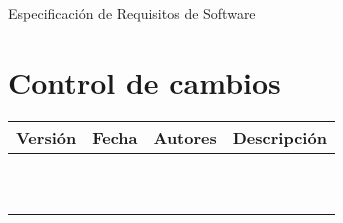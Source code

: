 \documentclass{article}
\title{\nombredelproyecto}
\author{Alejandro Barrachina Argudo \\
David Cantador Piedras \\
Rodrigo Sosa Sáez \\
Juan Pantaleón Femenía Quevedo \\
David Llanes Martín \\
Sergio Sánchez Chamizo  \\
Samuel Rodríguez Moreno \\
Rodrigo Souto Santos
}
\date{\today}
\begin{document}
\begin{titlepage}
    \makeatletter
    {
        \centering
        \vspace*{4cm}
        {\fontsize{40pt}{40pt}\scshape\textbf{\@title}\par}


        {\Huge Especificación de Requisitos de Software\par}

        \vspace*{1cm}
        {\Large\itshape
            \@author
            \par}
    }
    \vfill
    \makeatother
\end{titlepage}
\newpage

\section*{Control de cambios} %
\noindent\begin{tabularx}{\textwidth}{ |l|l|p{5cm}|X| }
    \hline
    \textbf{Versión} & \textbf{Fecha} & \textbf{Autores} & \textbf{Descripción} \\
    \hline
                     &                &                  &                      \\
    \hline
                     &                &                  &                      \\
    \hline
                     &                &                  &                      \\
    \hline
                     &                &                  &                      \\
    \hline
                     &                &                  &                      \\
    \hline
                     &                &                  &                      \\
    \hline
                     &                &                  &                      \\
    \hline
                     &                &                  &                      \\
    \hline
                     &                &                  &                      \\
    \hline
                     &                &                  &                      \\
    \hline
\end{tabularx}

\newpage
\tableofcontents
\newpage


\newpage

\newpage

\end{document}
